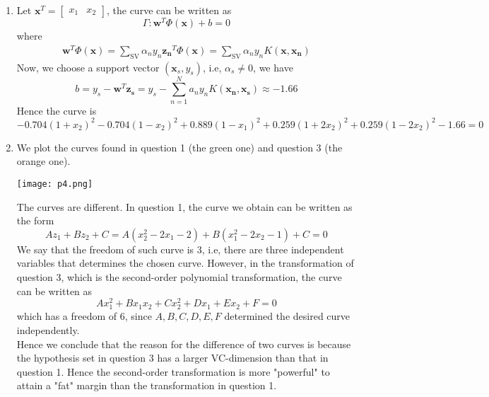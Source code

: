 \documentclass{article}
\begin{document}
\begin{CJK*}{UTF8}{bsmi}
\begin{normalsize}
\begin{enumerate}[label=\textbf{\arabic*}.]
        \item Let $\mathbf{x}^T = \begin{bmatrix}x_1&x_2 \end{bmatrix}$, the curve can be written as
        \[ \Gamma: \mathbf{w}^T\Phi(\mathbf{x})+ b = 0 \]
        where
        \[ \begin{aligned} \mathbf{w}^T\Phi(\mathbf{x}) = \sum_{\text{SV}}\alpha_n y_n \mathbf{z_n}^T \Phi(\mathbf{x}) = \sum_{\text{SV}}\alpha_n y_n K(\mathbf{x}, \mathbf{x_n}) \end{aligned}\]
        Now, we choose a support vector $(\mathbf{x}_s, y_s)$, i.e, $\alpha_s \neq 0$, we have 
        \[ b = y_s - \mathbf{w}^T\mathbf{z_s} = y_s - \sum_{n=1}^{N} a_n y_n K(\mathbf{x_n}, \mathbf{x_s}) \approx -1.66 \]
        Hence the curve is
        \[ -0.704(1+x_2)^2 -0.704(1-x_2)^2 + 0.889(1-x_1)^2 + 0.259(1+2x_2)^2 + 0.259(1-2x_2)^2 - 1.66 = 0 \]
        
        \item We plot the curves found in question 1 (the green one) and question 3 (the orange one).
        \begin{center}
            \texttt{[image: p4.png]}
        \end{center}
        
        The curves are different. In question 1, the curve we obtain can be written as the form
        \[ Az_1 + Bz_2 + C = A(x_2^2 - 2x_1 -2) + B(x_1^2-2x_2-1) + C = 0 \]
        We say that the freedom of such curve is 3, i.e, there are three independent variables that determines the chosen curve. However, in the transformation of question 3, which is the second-order polynomial transformation, the curve can be written as
        \[ Ax_1^2 + Bx_1x_2 + Cx_2^2 + Dx_1 + Ex_2 + F = 0 \]
        which has a freedom of 6, since $A, B, C, D, E, F$ determined the desired curve independently.\\
        Hence we conclude that the reason for the difference of two curves is because the hypothesis set in question 3 has a larger VC-dimension than that in question 1. Hence the second-order transformation is more "powerful" to attain a "fat" margin than the transformation in question 1.
        

\end{enumerate}
\end{normalsize}
\end{CJK*}
\end{document}
